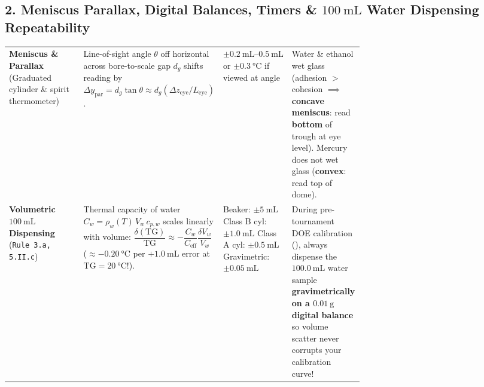 \subsection{2. Meniscus Parallax, Digital Balances, Timers \& $\SI{100}{\milli\liter}$ Water Dispensing Repeatability}
\begin{table}[h!]
\centering
{}\label{tab:17:labgear}
\footnotesize
\setlength{\tabcolsep}{3.5pt}
\renewcommand{\arraystretch}{1.15}
\begin{tabularx}{\linewidth}{@{}>{\raggedright\arraybackslash}p{0.21\linewidth} >{\raggedright\arraybackslash}p{0.34\linewidth} C{0.14\linewidth} >{\raggedright\arraybackslash}X@{}}
\toprule
{} &  &  &  \\
\midrule
\textbf{Meniscus \& Parallax} \newline (Graduated cylinder \& spirit thermometer) &
Line-of-sight angle $\theta$ off horizontal across bore-to-scale gap $d_g$ shifts reading by $\Delta y_{\mathrm{par}} = d_g \tan\theta \approx d_g(\Delta z_{\mathrm{eye}} / L_{\mathrm{eye}})$. &
$\pm\SIrange{0.2}{0.5}{\milli\liter}$ or $\pm\SI{0.3}{\celsius}$ if viewed at angle &
Water \& ethanol wet glass (adhesion $>$ cohesion $\implies$ \textbf{concave meniscus}: read \textbf{bottom} of trough at eye level). Mercury does not wet glass (\textbf{convex}: read top of dome). \\
\textbf{Volumetric $\SI{100}{\milli\liter}$ Dispensing} (\texttt{Rule 3.a, 5.II.c}) &
Thermal capacity of water $C_w = \rho_w(T)\,V_w\,c_{p,w}$ scales linearly with volume: $\dfrac{\delta(\mathrm{TG})}{\mathrm{TG}} \approx -\dfrac{C_w}{C_{\mathrm{eff}}}\dfrac{\delta V_w}{V_w}$ ($\approx -\SI{0.20}{\celsius}$ per $+\SI{1.0}{\milli\liter}$ error at $\mathrm{TG}=\SI{20}{\celsius}$!). &
Beaker: $\pm\SI{5}{\milli\liter}$ \newline Class B cyl: $\pm\SI{1.0}{\milli\liter}$ \newline Class A cyl: $\pm\SI{0.5}{\milli\liter}$ \newline Gravimetric: $\pm\SI{0.05}{\milli\liter}$ &
During pre-tournament DOE calibration (), always dispense the $\SI{100.0}{\milli\liter}$ water sample \textbf{gravimetrically on a $\SI{0.01}{\gram}$ digital balance} so volume scatter never corrupts your calibration curve! \\

\end{tabularx}
\end{table}
